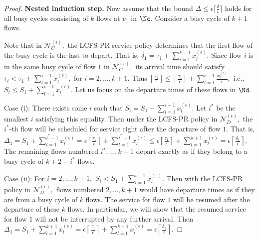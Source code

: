 \begin{proof}
	\textbf{Nested induction step. }Now assume that the bound $\Delta\leq\epsilon\lceil\frac{\delta}{\epsilon}\rceil$  holds for all busy
	cycles consisting of $k$ flows at $v_{1}$ in $\Nc$. Consider a busy cycle
	of $k+1$ flows.
	
	Note that in $\mathcal{N}_{C}^{(\epsilon)},$ the LCFS-PR service
	policy determines that the first flow of the busy cycle is the last
	to depart. That is, $\delta_{1}=\tau_{1}+\sum_{i=1}^{k+1}x_{i}^{(\epsilon)}.$
	Since flow $i$ is in the same busy cycle of flow $1$ in $\mathcal{N}_{C}^{(\epsilon)},$
	its arrival time should satisfy $\tau_{i}<\tau_{1}+\sum_{l=1}^{i-1}x_{l}^{(\epsilon)},$
	for $i=2,\ldots,k+1.$ Thus $\left\lceil \frac{\tau_{i}}{\epsilon}\right\rceil \leq\left\lceil \frac{\tau_{1}}{\epsilon}\right\rceil +\sum_{l=1}^{i-1}\frac{x_{l}^{(\epsilon)}}{\epsilon},$
	i.e., $S_{i}\leq S_{1}+\sum_{l=1}^{i-1}x_{l}^{(\epsilon)}.$ Let us
	focus on the departure times of these flows in $\Nd.$
	
	\smallskip{}
	
	Case (i): There exists some $i$ such that $S_{i}=S_{1}+\sum_{l=1}^{i-1}x_{l}^{(\epsilon)}.$
	Let $i^{*}$ be the smallest $i$ satisfying this equality. Then under
	the LCFS-PR policy in $\mathcal{N}_{D}^{(\epsilon)},$ the $i^{*}$-th
	flow will be scheduled for service right after the departure of flow
	$1.$ That is, $\Delta_{1}=S_{1}+\sum_{l=1}^{i^{*}-1}x_{l}^{(\epsilon)}=\epsilon\left\lceil \frac{\tau_{1}}{\epsilon}\right\rceil +\sum_{l=1}^{i^{*}-1}x_{l}^{(\epsilon)}\leq\epsilon\left\lceil \frac{\tau_{1}}{\epsilon}\right\rceil +\sum_{l=1}^{k+1}x_{l}^{(\epsilon)}=\epsilon\left\lceil \frac{\delta_{1}}{\epsilon}\right\rceil .$
	The remaining flows numbered $i^{*},\ldots,k+1$ depart exactly as
	if they belong to a busy cycle of $k+2-i^{*}$ flows.
	
	\smallskip{}
	
	Case (ii): For $i=2,\ldots,k+1,$ $S_{i}<S_{1}+\sum_{l=1}^{i-1}x_{l}^{(\epsilon)}.$
	Then with the LCFS-PR policy in $\mathcal{N}_{D}^{(\epsilon)},$ flows
	numbered $2,\ldots,k+1$ would have departure times as if they are
	from a busy cycle of $k$ flows. The service for flow $1$ will be
	resumed after the departure of these $k$ flows. In particular, we
	will show that the resumed service for flow $1$ will not be interrupted
	by any further arrival. Then $\Delta_{1}=S_{1}+\sum_{l=1}^{k+1}x_{l}^{(\epsilon)}=\epsilon\left\lceil \frac{\tau_{1}}{\epsilon}\right\rceil +\sum_{l=1}^{k+1}x_{l}^{(\epsilon)}=\epsilon\left\lceil \frac{\delta_{1}}{\epsilon}\right\rceil .$
	

\end{proof}
